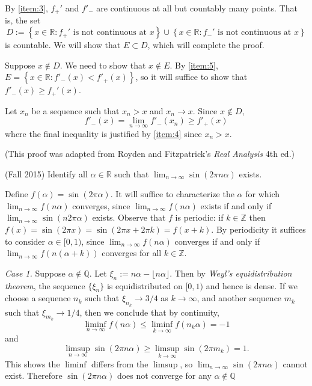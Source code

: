 \documentclass{exam}
\theoremstyle{problemstyle}
\newcommand{\1}[1]{\textbf{1}_{\left[#1\right]}} %
\def\limn{\lim_{n\to\infty}} %
\def\R{\mathbb{R}} %
\def\Z{\mathbb{Z}} %
\def\Q{\mathbb{Q}} %
\begin{document}
\begin{questions}
\begin{solution}
By \ref{item:3}, $f_{+}'$ and $f'_{-}$ are continuous at all but countably many points. That is, the set  $$D:=\left\{ x\in \R: f_{+}'\text{ is not continuous at }x \right\}\cup \left\{ x\in \R: f_{-}'\text{ is not continuous at }x \right\}$$ is countable. We will show that $E\subset D$, which will complete the proof.

Suppose $x\notin D$. We need to show that $x\notin E$. By \ref{item:5}, $E=\left\{ x\in \R : f'_{-}(x)< f'_{+}(x) \right\}$, so it will suffice to show that $f'_{-}(x)\geq f_{+}'(x)$.

Let $x_{n}$ be a sequence such that $x_{n}>x$ and $x_{n}\to x$. Since $x\notin D$,
\begin{equation*}
  f'_{-}(x)=\limn f'_{-}(x_{n})\geq f'_{+}(x)
\end{equation*}
where the final inequality is justified by \ref{item:4} since $x_{n}>x$.

(This proof was adapted from Royden and Fitzpatrick's \textit{Real Analysis} 4th ed.)
\end{solution}

\question (Fall 2015) Identify all $\alpha\in \R$ such that $\lim_{n\to\infty} \sin(2 \pi n \alpha)$ exists.

\begin{solution}
	Define $f(\alpha)=\sin(2\pi \alpha)$. It will suffice to characterize the $\alpha$ for which $\limn f(n\alpha)$ converges, since $\limn f(n\alpha)$ exists if and only if $\limn \sin(n2\pi \alpha)$ exists. Observe that $f$ is periodic: if $k\in \Z$ then $f(x)=\sin(2\pi x) = \sin(2\pi x +2\pi k) =f(x+k)$. By periodicity it suffices to consider $\alpha\in [0,1)$, since $\limn f(n\alpha)$ converges if and only if $\limn f(n(\alpha+k))$ converges for all $k\in \Z$. 

  \textit{Case 1.} Suppose $\alpha \notin \Q$. Let $\xi_{n}:= n\alpha - \lfloor n\alpha \rfloor$. Then by \emph{Weyl's equidistribution theorem}, the sequence $\{ \xi_{n} \}$ is equidistributed on $[0,1)$ and hence is dense. If we choose a sequence $n_k$ such that $\xi_{n_k} \to 3/4$ as $k \to \infty$, and another sequence $m_k$ such that $\xi_{m_k} \to 1/4$, then we conclude that by continuity,
  \[ \liminf_{n \to \infty} f(n \alpha) \leq \liminf_{k \to \infty} f(n_k \alpha) = -1 \]
  and
  \[ \limsup_{n \to \infty} \sin(2 \pi n \alpha) \geq \limsup_{k \to \infty} \sin(2 \pi m_k) = 1. \]
  This shows the $\liminf$ differs from the $\limsup$, so $\limn \sin(2 \pi n \alpha)$ cannot exist. Therefore $\sin(2\pi n \alpha)$ does not converge for any $\alpha\notin \Q$
  

\end{solution}
\end{questions}
\end{document}
